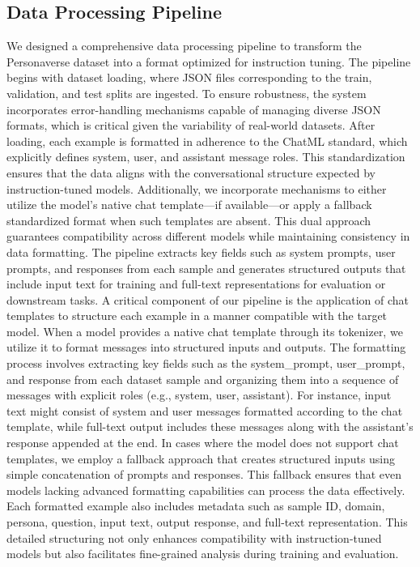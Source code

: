 \documentclass[11pt]{article}
\begin{document}
\subsection{Data Processing Pipeline}
We designed a comprehensive data processing pipeline to transform the Personaverse dataset into a format optimized for instruction tuning. The pipeline begins with dataset loading, where JSON files corresponding to the train, validation, and test splits are ingested. To ensure robustness, the system incorporates error-handling mechanisms capable of managing diverse JSON formats, which is critical given the variability of real-world datasets. After loading, each example is formatted in adherence to the ChatML standard, which explicitly defines system, user, and assistant message roles. This standardization ensures that the data aligns with the conversational structure expected by instruction-tuned models. Additionally, we incorporate mechanisms to either utilize the model's native chat template—if available—or apply a fallback standardized format when such templates are absent. This dual approach guarantees compatibility across different models while maintaining consistency in data formatting. The pipeline extracts key fields such as system prompts, user prompts, and responses from each sample and generates structured outputs that include input text for training and full-text representations for evaluation or downstream tasks.
A critical component of our pipeline is the application of chat templates to structure each example in a manner compatible with the target model. When a model provides a native chat template through its tokenizer, we utilize it to format messages into structured inputs and outputs. The formatting process involves extracting key fields such as the system\_prompt, user\_prompt, and response from each dataset sample and organizing them into a sequence of messages with explicit roles (e.g., system, user, assistant). For instance, input text might consist of system and user messages formatted according to the chat template, while full-text output includes these messages along with the assistant's response appended at the end. In cases where the model does not support chat templates, we employ a fallback approach that creates structured inputs using simple concatenation of prompts and responses. This fallback ensures that even models lacking advanced formatting capabilities can process the data effectively. Each formatted example also includes metadata such as sample ID, domain, persona, question, input text, output response, and full-text representation. This detailed structuring not only enhances compatibility with instruction-tuned models but also facilitates fine-grained analysis during training and evaluation.
\end{document}
